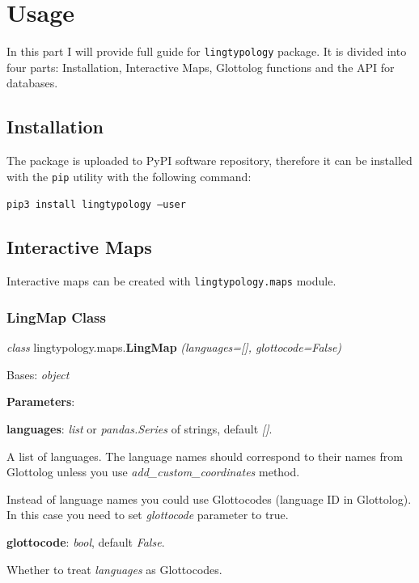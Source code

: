 \documentclass[a4paper,12pt]{article}
\begin{document}
\newpage

\section{Usage}
In this part I will provide full guide for \texttt{lingtypology} package. It is divided into four parts: Installation, Interactive Maps, Glottolog functions and the API for databases.

\subsection{Installation}
The package is uploaded to PyPI software repository, therefore it can be installed with the \texttt{pip} utility with the following command:

\texttt{pip3 install lingtypology --user}

\subsection{Interactive Maps}
Interactive maps can be created with \texttt{lingtypology.maps} module.

\subsubsection{LingMap Class}

\textit{class} lingtypology.maps.\textbf{LingMap} \textit{(languages=[], glottocode=False)}

Bases: \textit{object}

\textbf{Parameters}:
\begin{itemize}
\begin{samepage}
 \item \textbf{languages}: \textit{list} or \textit{pandas.Series} of strings, default \textit{[]}.

 A list of languages. The language names should correspond to their names from Glottolog unless you use \textit{add\_custom\_coordinates} method.
 
 Instead of language names you could use Glottocodes (language ID in Glottolog). In this case you need to set \textit{glottocode} parameter to true.
 
 \item \textbf{glottocode}: \textit{bool}, default \textit{False}.
 
 Whether to treat \textit{languages} as Glottocodes.
 
\end{samepage}
\end{itemize}
\end{document}
